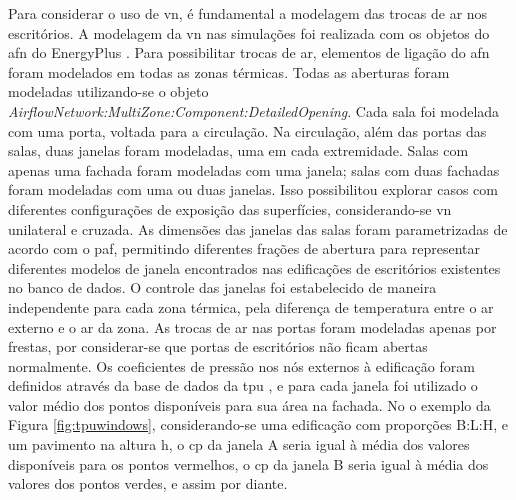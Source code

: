 Para considerar o uso de \acrfull{vn}, é fundamental a modelagem das trocas de ar nos escritórios. A modelagem da \acrshort{vn} nas simulações foi realizada com os objetos do \acrfull{afn} do EnergyPlus \cite{EnergyPlus2018}.
Para possibilitar trocas de ar, elementos de ligação do \acrshort{afn} foram modelados em todas as zonas térmicas.
Todas as aberturas foram modeladas utilizando-se o objeto \textit{AirflowNetwork:MultiZone:Component:DetailedOpening}.
Cada sala foi modelada com uma porta, voltada para a circulação.
Na circulação, além das portas das salas, duas janelas foram modeladas, uma em cada extremidade. 
Salas com apenas uma fachada foram modeladas com uma janela; salas com duas fachadas foram modeladas com uma ou duas janelas. Isso possibilitou explorar casos com diferentes configurações de exposição das superfícies, considerando-se \acrshort{vn} unilateral e cruzada.		
As dimensões das janelas das salas foram parametrizadas de acordo com o \acrfull{paf}, permitindo diferentes frações de abertura para representar diferentes modelos de janela encontrados nas edificações de escritórios existentes no banco de dados.
O controle das janelas foi estabelecido de maneira independente para cada zona térmica, pela diferença de temperatura entre o ar externo e o ar da zona.
As trocas de ar nas portas foram modeladas apenas por frestas, por considerar-se que portas de escritórios não ficam abertas normalmente.  %
Os coeficientes de pressão nos nós externos à edificação foram definidos através da base de dados da \acrlong{tpu} \cite{TPU2018}, e para cada janela foi utilizado o valor médio dos pontos disponíveis para sua área na fachada. No o exemplo da Figura \ref{fig:tpuwindows}, considerando-se uma edificação com proporções B:L:H, e um pavimento na altura h, o \acrshort{cp} da janela A seria igual à média dos valores disponíveis para os pontos vermelhos, o \acrshort{cp} da janela B seria igual à média dos valores dos pontos verdes, e assim por diante.

